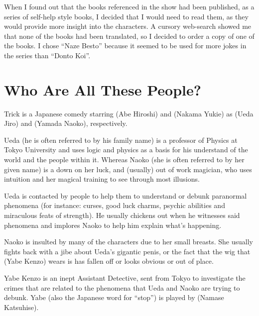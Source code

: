 \par When I found out that the books referenced in the show had been published, as a series of self-help style books, I decided that I would need to read them, as they would provide more insight into the characters. A cursory web-search showed me that none of the books had been translated, so I decided to order a copy of one of the books. I chose ``Naze Besto'' because it seemed to be used for more jokes in the series than ``Donto Koi''.


\section*{Who Are All These People?}


Trick is a Japanese comedy starring  (Abe Hiroshi) and  (Nakama Yukie) as  (Ueda Jiro) and  (Yamada Naoko), respectively.

\par Ueda (he is often referred to by his family name) is a professor of Physics at Tokyo University and uses logic and physics as a basis for his understand of the world and the people within it. Whereas Naoko (she is often referred to by her given name) is a down on her luck, and (usually) out of work magician, who uses intuition and her magical training to see through most illusions.

\par Ueda is contacted by people to help them to understand or debunk paranormal phenomena (for instance: curses, good luck charms, psychic abilities and miraculous feats of strength). He usually chickens out when he witnesses said phenomena and implores Naoko to help him explain what's happening.

\par Naoko is insulted by many of the characters due to her small breasts. She usually fights back with a jibe about Ueda's gigantic penis, or the fact that the wig that  (Yabe Kenzo) wears is has fallen off or looks obvious or out of place.

\par Yabe Kenzo is an inept Assistant Detective, sent from Tokyo to investigate the crimes that are related to the phenomena that Ueda and Naoko are trying to debunk. Yabe (also the Japanese word for ``stop'') is played by  (Namase Katsuhise).

